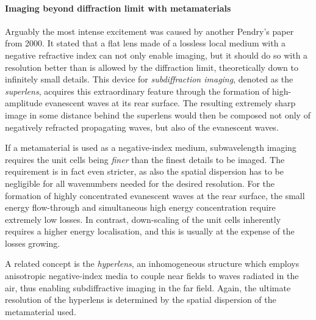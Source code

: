 \paragraph{Imaging beyond diffraction limit with metamaterials} %
Arguably the most intense excitement was caused by another Pendry's paper \cite{pendry2000negative} from 2000. It stated that a flat lens made of a lossless local medium with a negative refractive index can not only enable imaging, but it should do so with a resolution better than is allowed by the diffraction limit, theoretically down to infinitely small details. This device for \textit{subdiffraction imaging}, denoted as the \textit{superlens}, acquires this extraordinary feature through the formation of high-amplitude evanescent waves at its rear surface. The resulting extremely sharp image in some distance behind the superlens would then be composed not only of negatively refracted propagating waves, but also of the evanescent waves.

If a metamaterial is used as a negative-index medium, subwavelength imaging requires the unit cells being \textit{finer} than the finest details to be imaged. The requirement is in fact even stricter, as also the spatial dispersion has to be negligible for all wavenumbers needed for the desired resolution. %
For the formation of highly concentrated evanescent waves at the rear surface, the small energy flow-through and simultaneous high energy concentration require extremely low losses. In contrast, down-scaling of the unit cells inherently requires a higher energy localisation, and this is usually at the expense of the losses growing.

A related concept is the \textit{hyperlens}, an inhomogeneous structure which employs anisotropic negative-index media to couple near fields to waves radiated in the air, thus enabling subdiffractive imaging in the far field. Again, the ultimate resolution of the hyperlens is determined by the spatial dispersion of the metamaterial used.

